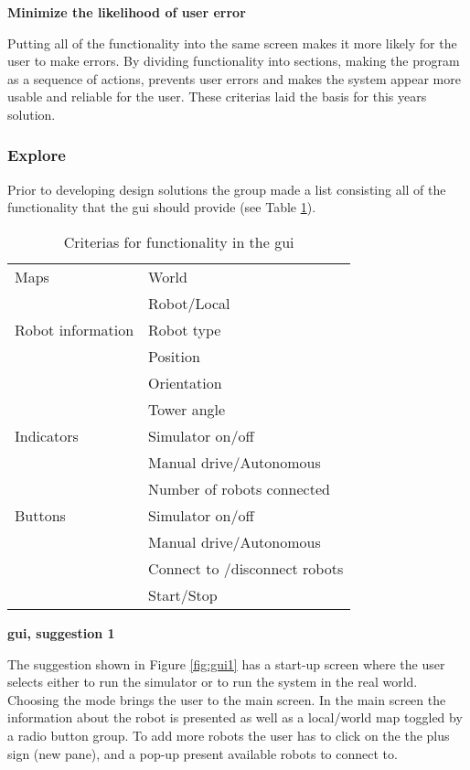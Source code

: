 \textbf{Minimize the likelihood of user error}

Putting all of the functionality into the same screen makes it more likely for the user to make errors. By dividing functionality into sections, making the program as a sequence of actions, prevents user errors and makes the system appear more usable and reliable for the user. These criterias laid the basis for this years solution. 

\subsubsection{Explore}
Prior to developing design solutions the group made a list consisting all of the functionality that the \acrshort{gui} should provide (see Table \ref{tab:guicriterias}).
\begin{table}[ht]
\begin{center}
 \begin{tabular}{|l l|} 
 \hline
 Maps               &   World \\
                    &   Robot/Local \\
 \hline
 Robot information  &   Robot type \\
                    &   Position \\
                    &   Orientation \\
                    &   Tower angle \\
 \hline
 Indicators         &   Simulator on/off \\
                    &   Manual drive/Autonomous \\
                    &   Number of robots connected \\
 \hline
 Buttons            &   Simulator on/off \\
                    &   Manual drive/Autonomous \\
                    &   Connect to /disconnect robots \\
                    &   Start/Stop \\

\hline
\end{tabular}
\end{center}
\caption{Criterias for functionality in the \acrshort{gui}}
\label{tab:guicriterias}
\end{table}

\textbf{\acrlong{gui}, suggestion 1}

The suggestion shown in Figure \ref{fig:gui1} has a start-up screen where the user selects either to run the simulator or to run the system in the real world. Choosing the mode brings the user to the main screen. In the main screen the information about the robot is presented as well as a local/world map toggled by a radio button group. To add more robots the user has to click on the the plus sign (new pane), and a pop-up present available robots to connect to.

